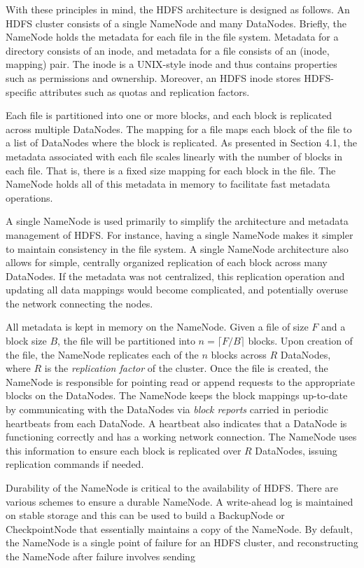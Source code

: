 \documentclass[11pt, a4paper]{article}
\begin{document}
\begin{multicols*}{2}
With these principles in mind, the HDFS architecture is designed as follows. An HDFS cluster consists of a single NameNode and many DataNodes. Briefly, the NameNode holds the metadata for each file in the file system. Metadata for a directory consists of an inode, and metadata for a file consists of an (inode, mapping) pair. The inode is a UNIX-style inode and thus contains properties such as permissions and ownership. Moreover, an HDFS inode stores HDFS-specific attributes such as quotas and replication factors.

Each file is partitioned into one or more blocks, and each block is replicated across multiple DataNodes. The mapping for a file maps each block of the file to a list of DataNodes where the block is replicated. As presented in Section 4.1, the metadata associated with each file scales linearly with the number of blocks in each file. That is, there is a fixed size mapping for each block in the file. The NameNode holds all of this metadata in memory to facilitate fast metadata operations.

A single NameNode is used primarily to simplify the architecture and metadata management of HDFS. For instance, having a single NameNode makes it simpler to maintain consistency in the file system. A single NameNode architecture also allows for simple, centrally organized replication of each block across many DataNodes. If the metadata was not centralized, this replication operation and updating all data mappings would become complicated, and potentially overuse the network connecting the nodes.

All metadata is kept in memory on the NameNode. Given a file of size $F$ and a block size $B$, the file will be partitioned into $n = \lceil F/B\rceil$ blocks. Upon creation of the file, the NameNode replicates each of the $n$ blocks across $R$ DataNodes, where $R$ is the \textit{replication factor} of the cluster. Once the file is created, the NameNode is responsible for pointing read or append requests to the appropriate blocks on the DataNodes. The NameNode keeps the block mappings up-to-date by communicating with the DataNodes via \textit{block reports} carried in periodic heartbeats from each DataNode. A heartbeat also indicates that a DataNode is functioning correctly and has a working network connection. The NameNode uses this information to ensure each block is replicated over $R$ DataNodes, issuing replication commands if needed.

Durability of the NameNode is critical to the availability of HDFS. There are various schemes to ensure a durable NameNode. A write-ahead log is maintained on stable storage and this can be used to build a BackupNode or CheckpointNode that essentially maintains a copy of the NameNode. By default, the NameNode is a single point of failure for an HDFS cluster, and reconstructing the NameNode after failure involves sending 


\end{multicols*}
\end{document}

